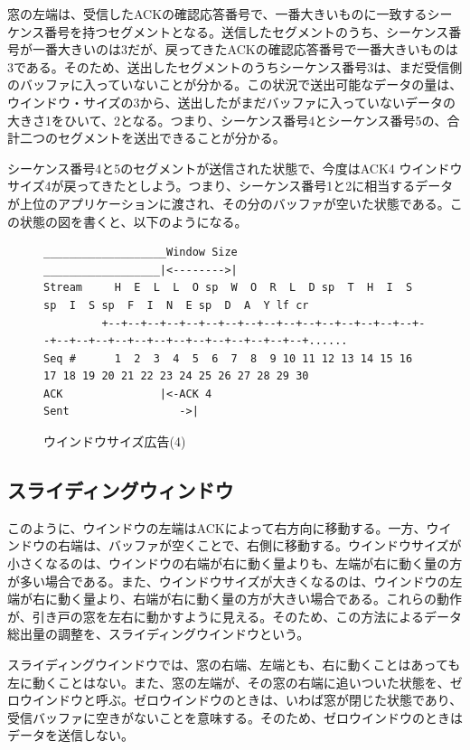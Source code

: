 窓の左端は、受信したACKの確認応答番号で、一番大きいものに一致するシーケンス番号を持つセグメントとなる。送信したセグメントのうち、シーケンス番号が一番大きいのは3だが、戻ってきたACKの確認応答番号で一番大きいものは3である。そのため、送出したセグメントのうちシーケンス番号3は、まだ受信側のバッファに入っていないことが分かる。この状況で送出可能なデータの量は、ウインドウ・サイズの3から、送出したがまだバッファに入っていないデータの大きさ1をひいて、2となる。つまり、シーケンス番号4とシーケンス番号5の、合計二つのセグメントを送出できることが分かる。

シーケンス番号4と5のセグメントが送信された状態で、今度はACK4 ウインドウサイズ4が戻ってきたとしよう。つまり、シーケンス番号1と2に相当するデータが上位のアプリケーションに渡され、その分のバッファが空いた状態である。この状態の図を書くと、以下のようになる。

\begin{figure}[h!] \caption{ウインドウサイズ広告(4)} \label{windowsize4}
\begin{center}
{\scriptsize
\begin{verbatim}
___________________Window Size
__________________|<-------->|      
Stream     H  E  L  L  O sp  W  O  R  L  D sp  T  H  I  S sp  I  S sp  F  I  N  E sp  D  A  Y lf cr              
         +--+--+--+--+--+--+--+--+--+--+--+--+--+--+--+--+--+--+--+--+--+--+--+--+--+--+--+--+--+--+......
Seq #      1  2  3  4  5  6  7  8  9 10 11 12 13 14 15 16 17 18 19 20 21 22 23 24 25 26 27 28 29 30
ACK               |<-ACK 4  
Sent                 ->|
\end{verbatim}
}
\end{center}
\end{figure}

\subsection{スライディングウィンドウ}

このように、ウインドウの左端はACKによって右方向に移動する。一方、ウインドウの右端は、バッファが空くことで、右側に移動する。ウインドウサイズが小さくなるのは、ウインドウの右端が右に動く量よりも、左端が右に動く量の方が多い場合である。また、ウインドウサイズが大きくなるのは、ウインドウの左端が右に動く量より、右端が右に動く量の方が大きい場合である。これらの動作が、引き戸の窓を左右に動かすように見える。そのため、この方法によるデータ総出量の調整を、スライディングウインドウという。

スライディングウインドウでは、窓の右端、左端とも、右に動くことはあっても左に動くことはない。また、窓の左端が、その窓の右端に追いついた状態を、ゼロウインドウと呼ぶ。ゼロウインドウのときは、いわば窓が閉じた状態であり、受信バッファに空きがないことを意味する。そのため、ゼロウインドウのときはデータを送信しない。

